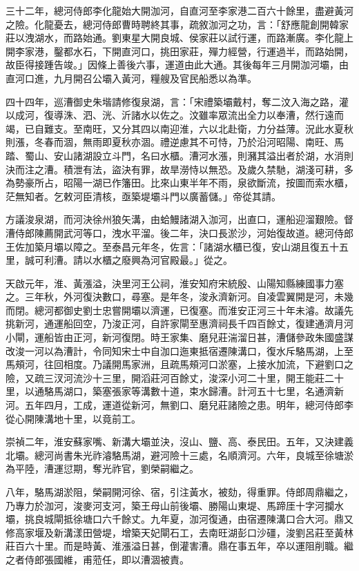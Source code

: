 三十二年，總河侍郎李化龍始大開泇河，自直河至李家港二百六十餘里，盡避黃河之險。化龍憂去，總河侍郎曹時聘終其事，疏敘泇河之功，言：「舒應龍創開韓家莊以洩湖水，而路始通。劉東星大開良城、侯家莊以試行運，而路漸廣。李化龍上開李家港，鑿都水石，下開直河口，挑田家莊，殫力經營，行運過半，而路始開，故臣得接踵告竣。」因條上善後六事，運道由此大通。其後每年三月開泇河壩，由直河口進，九月開召公壩入黃河，糧艘及官民船悉以為準。

四十四年，巡漕御史朱堦請修復泉湖，言：「宋禮築壩戴村，奪二汶入海之路，灌以成河，復導洙、泗、洸、沂諸水以佐之。汶雖率眾流出全力以奉漕，然行遠而竭，已自難支。至南旺，又分其四以南迎淮，六以北赴衛，力分益薄。況此水夏秋則漲，冬春而涸，無雨即夏秋亦涸。禮逆慮其不可恃，乃於沿河昭陽、南旺、馬踏、蜀山、安山諸湖設立斗門，名曰水櫃。漕河水漲，則瀦其溢出者於湖，水消則決而注之漕。積泄有法，盜決有罪，故旱澇恃以無恐。及歲久禁馳，湖淺可耕，多為勢豪所占，昭陽一湖已作籓田。比來山東半年不雨，泉欲斷流，按圖而索水櫃，茫無知者。乞敕河臣清核，亟築堤壩斗門以廣蓄儲。」帝從其請。

方議浚泉湖，而河決徐州狼矢溝，由蛤鰻諸湖入泇河，出直口，運船迎溜艱險。督漕侍郎陳薦開武河等口，洩水平溜。後二年，決口長淤沙，河始復故道。總河侍郎王佐加築月壩以障之。至泰昌元年冬，佐言：「諸湖水櫃已復，安山湖且復五十五里，誠可利漕。請以水櫃之廢興為河官殿最。」從之。

天啟元年，淮、黃漲溢，決里河王公祠，淮安知府宋統殷、山陽知縣練國事力塞之。三年秋，外河復決數口，尋塞。是年冬，浚永濟新河。自凌雲翼開是河，未幾而閉。總河都御史劉士忠嘗開壩以濟運，已復塞。而淮安正河三十年未濬。故議先挑新河，通運船回空，乃浚正河，自許家閘至惠濟祠長千四百餘丈，復建通濟月河小閘，運船皆由正河，新河復閉。時王家集、磨兒莊湍溜日甚，漕儲參政朱國盛謀改浚一河以為漕計，令同知宋士中自泇口迤東抵宿遷陳溝口，復水斥駱馬湖，上至馬頰河，往回相度。乃議開馬家洲，且疏馬頰河口淤塞，上接水加流，下避劉口之險，又疏三汊河流沙十三里，開滔莊河百餘丈，浚深小河二十里，開王能莊二十里，以通駱馬湖口，築塞張家等溝數十道，束水歸漕。計河五十七里，名通濟新河。五年四月，工成，運道從新河，無劉口、磨兒莊諸險之患。明年，總河侍郎李從心開陳溝地十里，以竟前工。

崇禎二年，淮安蘇家嘴、新溝大壩並決，沒山、鹽、高、泰民田。五年，又決建義北壩。總河尚書朱光祚濬駱馬湖，避河險十三處，名順濟河。六年，良城至徐塘淤為平陸，漕運愆期，奪光祚官，劉榮嗣繼之。

八年，駱馬湖淤阻，榮嗣開河徐、宿，引注黃水，被劾，得重罪。侍郎周鼎繼之，乃專力於泇河，浚麥河支河，築王母山前後壩、勝陽山東堤、馬蹄厓十字河攔水壩，挑良城閘抵徐塘口六千餘丈。九年夏，泇河復通，由宿遷陳溝口合大河。鼎又修高家堰及新溝漾田營堤，增築天妃閘石工，去南旺湖彭口沙礓，浚劉呂莊至黃林莊百六十里。而是時黃、淮漲溢日甚，倒灌害漕。鼎在事五年，卒以運阻削職。繼之者侍郎張國維，甫蒞任，即以漕涸被責。

